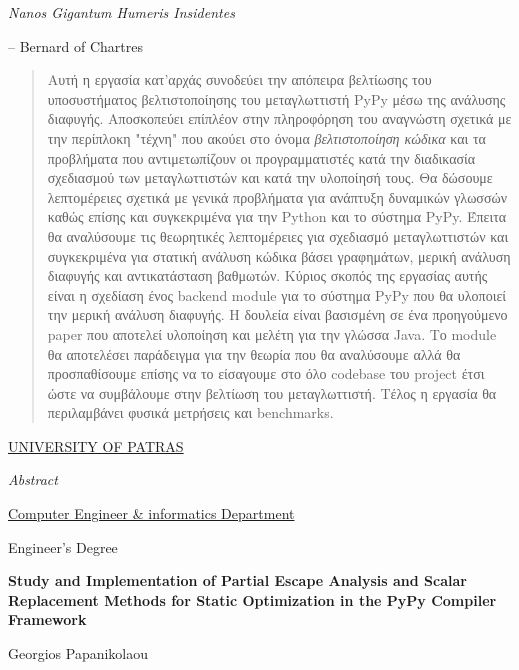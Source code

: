 \documentclass[12pt, english, singlespacing, parskip, headsepline]{MastersDoctoralThesis}
\begin{document}
\newpage\null\thispagestyle{empty}\newpage
\vspace*{0.2\textheight}

\noindent\textit{Nanos Gigantum Humeris Insidentes}\bigbreak

\hfill – Bernard of Chartres


\begin{abstract}

Αυτή η εργασία κατ'αρχάς συνοδεύει την απόπειρα βελτίωσης του υποσυστήματος
βελτιστοποίησης του μεταγλωττιστή PyPy μέσω της ανάλυσης διαφυγής. Αποσκοπεύει
επίπλέον στην πληροφόρηση του αναγνώστη σχετικά με την περίπλοκη "τέχνη" που
ακούει στο όνομα \textit{βελτιστοποίηση κώδικα} και τα προβλήματα που
αντιμετωπίζουν οι προγραμματιστές κατά την διαδικασία σχεδιασμού των
μεταγλωττιστών και κατά την υλοποίησή τους. Θα δώσουμε λεπτομέρειες σχετικά με
γενικά προβλήματα για ανάπτυξη δυναμικών γλωσσών καθώς επίσης και συγκεκριμένα
για την Python και το σύστημα PyPy. Έπειτα θα αναλύσουμε τις θεωρητικές
λεπτομέρειες για σχεδιασμό μεταγλωττιστών και συγκεκριμένα για στατική ανάλυση
κώδικα βάσει γραφημάτων, μερική ανάλυση διαφυγής και αντικατάσταση βαθμωτών.
Κύριος σκοπός της εργασίας αυτής είναι η σχεδίαση ένος backend module για το
σύστημα PyPy που θα υλοποιεί την μερική ανάλυση διαφυγής. Η δουλεία είναι
βασισμένη σε ένα προηγούμενο paper που αποτελεί υλοποίηση και μελέτη για την
γλώσσα Java. Το module θα αποτελέσει παράδειγμα για την θεωρία που θα αναλύσουμε
αλλά θα προσπαθίσουμε επίσης να το είσαγουμε στο όλο codebase του project έτσι
ώστε να συμβάλουμε στην βελτίωση του μεταγλωττιστή. Τέλος η εργασία θα
περιλαμβάνει φυσικά μετρήσεις και benchmarks.


\end{abstract}

\newpage\null\thispagestyle{empty}\newpage
\checktoopen
\tttypeout{\abstractname}
\null\vfil
\thispagestyle{plain}
\begin{center}
{\normalsize \MakeUppercase{\href{http://www.upatras.gr/en}{University of Patras}} \par}
\bigskip
{\huge\textit{Abstract} \par}
\bigskip
{\normalsize \href{https://www.ceid.upatras.gr/en/}{Computer Engineer \& informatics Department} \par}
\bigskip
{\normalsize Engineer's Degree\par}
\bigskip
{\normalsize\bfseries Study and Implementation of Partial Escape Analysis and Scalar
Replacement Methods for Static Optimization in the PyPy Compiler Framework \par}
\medskip
{\normalsize Georgios Papanikolaou \par}
\bigskip
\end{center}
\end{document}
